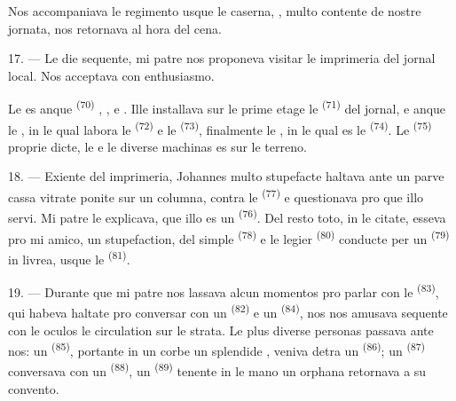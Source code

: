 Nos accompaniava le regimento usque le caserna, , multo contente de
nostre jornata, nos retornava al hora del cena.

\VUsaut{3.0mm}

17. --- Le die sequente, mi patre nos proponeva visitar le imprimeria del jornal
local. Nos acceptava con enthusiasmo.

Le  es anque  \textsuperscript{(70)}
, ,  e
. Ille installava sur le prime etage le 
\textsuperscript{(71)} del jornal, e anque le , in le
qual labora le  \textsuperscript{(72)} e le
 \textsuperscript{(73)}, finalmente le
, in le qual es le  \textsuperscript{(74)}. Le 
\textsuperscript{(75)} proprie dicte, le  e le diverse machinas es
sur le terreno.

\VUsaut{3.0mm}

18. --- Exiente del imprimeria, Johannes multo stupefacte haltava ante un parve
cassa vitrate ponite sur un columna, contra le 
\textsuperscript{(77)} e questionava pro que illo servi. Mi patre le explicava,
que illo es un  \textsuperscript{(76)}. Del resto
toto, in le citate, esseva pro mi amico, un stupefaction, del simple
 \textsuperscript{(78)} e le legier  \textsuperscript{(80)} conducte per un 
\textsuperscript{(79)} in livrea, usque le 
\textsuperscript{(81)}.

19. --- Durante que mi patre nos lassava alcun momentos pro parlar con le
 \textsuperscript{(83)}, qui habeva haltate pro
conversar con un  \textsuperscript{(82)} e un 
\textsuperscript{(84)}, nos nos amusava sequente con le oculos le circulation sur
le strata. Le plus diverse personas passava ante nos: un  \textsuperscript{(85)}, portante in un corbe un splendide
, veniva detra un 
\textsuperscript{(86)}; un  \textsuperscript{(87)}
conversava con un  \textsuperscript{(88)}, un
 \textsuperscript{(89)} tenente in le mano un orphana retornava
a su convento.

